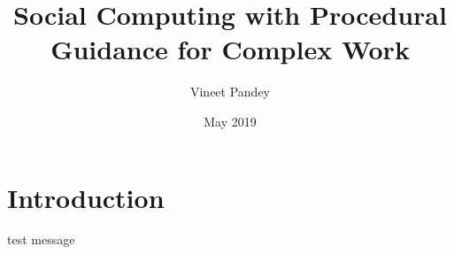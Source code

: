 \documentclass{article}
\title{Social Computing with Procedural Guidance for Complex Work}
\author{Vineet Pandey}
\date{May 2019}
\begin{document}
\maketitle



\section{Introduction}
test message
\end{document}

